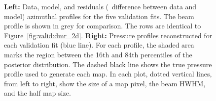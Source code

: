 \begin{figure}[t]
    \caption{
        \textbf{Left:} Data, model, and residuals (\ie\ difference between data and model) azimuthal profiles for the five validation fits.
        The beam profile is shown in grey for comparison.
        The rows are identical to Figure~\ref{fig:valid:dmr_2d}.
        \textbf{Right:} Pressure profiles reconstructed for each validation fit (blue line).
        For each profile, the shaded area marks the region between the 16th and 84th percentiles of the posterior distribution.
        The dashed black line shows the true pressure profile used to generate each map.
        In each plot, dotted vertical lines, from left to right, show the size of a map pixel, the beam HWHM, and the half map size.
    }
    \label{fig:valid:profiles}
\end{figure}

